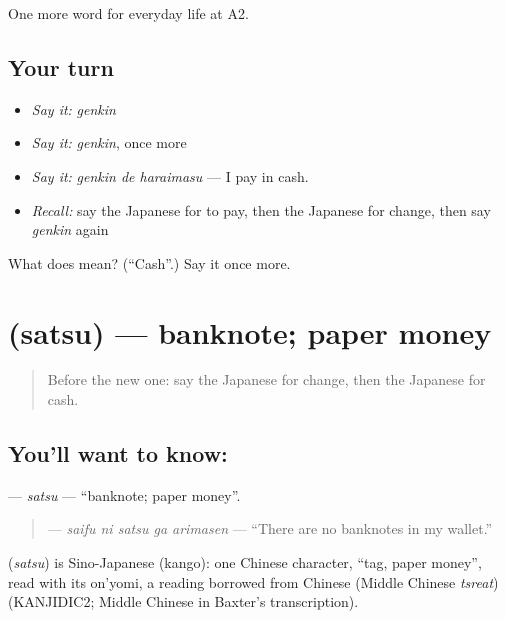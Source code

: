 \begin{grammarlens}[title={What you've built}]
One more word for everyday life at A2.
\end{grammarlens}

\subsection*{Your turn}
\begin{itemize}
\raggedright
  \item \emph{Say it:} \emph{genkin}
  \item \emph{Say it:} \emph{genkin}, once more
  \item \emph{Say it:} \emph{genkin de haraimasu} — I pay in cash.
  \item \emph{Recall:} say the Japanese for to pay, then the Japanese for change, then say \emph{genkin} again
\end{itemize}

\begin{tcolorbox}[breakable,colback=teal!4,colframe=teal!35!black,title={Before you move on}]
What does  mean? (\textquotedblleft{}Cash\textquotedblright{}.) Say it once more.
\end{tcolorbox}
\section[\texorpdfstring{\ja{さつ} (satsu)}{さつ (satsu)}]{ (satsu) — banknote; paper money}

\label{lesson:JA-C182-satsu}



\begin{quote}
Before the new one: say the Japanese for change, then the Japanese for cash.
\end{quote}

\subsection*{You'll want to know: }
\textbf{} — \emph{satsu} — \textquotedblleft{}banknote; paper money\textquotedblright{}.

\begin{quote}
\textbf{  } — \emph{saifu ni satsu ga arimasen} — \textquotedblleft{}There are no banknotes in my wallet.\textquotedblright{}
\end{quote}

\begin{cousinweb}
\textbf{} (\emph{satsu}) is Sino-Japanese (kango): one Chinese character, \textquotedblleft{}tag, paper money\textquotedblright{}, read with its on'yomi, a reading borrowed from Chinese (Middle Chinese \emph{tsreat}) (KANJIDIC2; Middle Chinese in Baxter's transcription).
\end{cousinweb}


